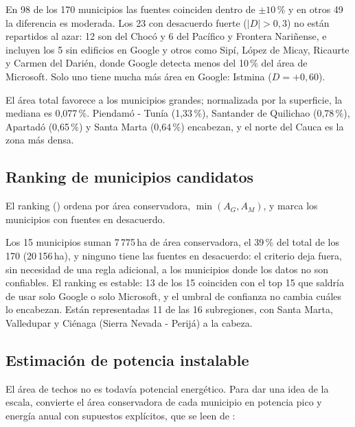 En 98 de los 170 municipios las fuentes coinciden dentro de $\pm 10$\,\% y en
otros 49 la diferencia es moderada. Los 23 con desacuerdo fuerte
($|D| > 0{,}3$) no están repartidos al azar: 12 son del Chocó y 6 del Pacífico
y Frontera Nariñense, e incluyen los 5 sin edificios en Google y otros como
Sipí, López de Micay, Ricaurte y Carmen del Darién, donde Google detecta menos
del 10\,\% del área de Microsoft. Solo uno tiene mucha más área en Google:
Istmina ($D = +0{,}60$).


El área total favorece a los municipios grandes; normalizada por la superficie,
la mediana es 0,077\,\%. Piendamó - Tunía (1,33\,\%), Santander de Quilichao
(0,78\,\%), Apartadó (0,65\,\%) y Santa Marta (0,64\,\%) encabezan, y el norte
del Cauca es la zona más densa.

\subsection{Ranking de municipios candidatos}
\label{sec:ranking}

El ranking () ordena por área conservadora,
$\min(A_G, A_M)$, y marca los municipios con fuentes en desacuerdo.



Los 15 municipios suman 7\,775\,ha de área conservadora, el 39\,\% del total de
los 170 (20\,156\,ha), y ninguno tiene las fuentes en desacuerdo: el criterio
deja fuera, sin necesidad de una regla adicional, a los municipios donde los
datos no son confiables. El ranking es estable: 13 de los 15 coinciden con el
top 15 que saldría de usar solo Google o solo Microsoft, y el umbral de
confianza no cambia cuáles lo encabezan. Están representadas 11 de las 16
subregiones, con Santa Marta, Valledupar y Ciénaga (Sierra Nevada - Perijá) a
la cabeza.

\subsection{Estimación de potencia instalable}
\label{sec:potencial}

El área de techos no es todavía potencial energético. Para dar una idea de la
escala,  convierte el área conservadora de cada municipio
en potencia pico y energía anual con supuestos explícitos, que se leen de
:

